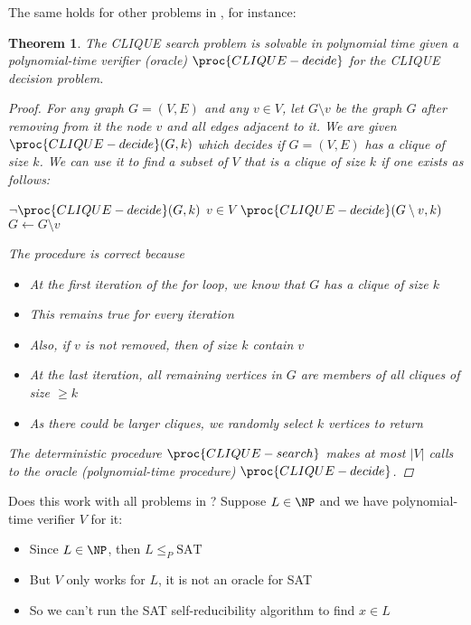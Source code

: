 \documentclass[a4paper]{report}
\newtheorem{theo}{Theorem}
\theoremstyle{definition}
\begin{document}
The same holds for other problems in \NP, for instance:
\begin{theo}
The CLIQUE search problem is solvable in polynomial time given a polynomial-time verifier (oracle) $\proc{CLIQUE-decide}$ for the CLIQUE decision problem.
\begin{proof}
For any graph $G = (V,E)$ and any $v \in V$, let $G \setminus v$ be the graph $G$ after removing from it the node $v$ and all edges adjacent to it. We are given $\proc{CLIQUE-decide}(G,k)$ which decides if $G=(V,E)$ has a clique of size $k$. We can use it to find a subset of $V$ that is a clique of size $k$ if one exists as follows:
\begin{codebox}
\li \If $\neg \proc{CLIQUE-decide}(G,k)$
\li \Then \Return {}
\End
\li \For $v \in V$ \Do
\li \If $\proc{CLIQUE-decide}(G \setminus v, k)$
\li \Then $G \gets G \setminus v$
\End
\End
\li {}
\end{codebox}
%
%
The procedure is correct because
\begin{itemize}
\item At the first iteration of the for loop, we know that $G$ has a clique of size $k$
\item This remains true for every iteration
\item Also, if $v$ is not removed, then  of size $k$ contain $v$
\item At the last iteration, all remaining vertices in $G$ are members of all cliques of size $\geq k$
\item As there could be larger cliques, we randomly select $k$ vertices to return
\end{itemize}
%
The deterministic procedure $\proc{CLIQUE-search}$ makes at most $|V|$ calls to the oracle (polynomial-time procedure) $\proc{CLIQUE-decide}$.
\end{proof}
\end{theo}

Does this work with all problems in \NP? Suppose $L \in \NP$ and we have polynomial-time verifier $V$ for it:
\begin{itemize}
\item Since $L \in \NP$, then $L \leq_P \text{SAT}$
\item But $V$ only works for $L$, it is not an oracle for SAT
\item So we can't run the SAT self-reducibility algorithm to find $x \in L$
\end{itemize}
\end{document}
